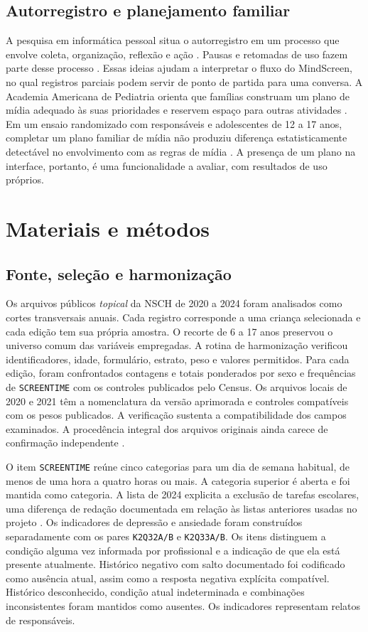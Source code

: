 ﻿\documentclass[12pt]{article}
\begin{document}
\subsection{Autorregistro e planejamento familiar}
A pesquisa em informática pessoal situa o autorregistro em um processo que envolve coleta, organização, reflexão e ação \cite{li2010informatica}. Pausas e retomadas de uso fazem parte desse processo \cite{epstein2015}. Essas ideias ajudam a interpretar o fluxo do MindScreen, no qual registros parciais podem servir de ponto de partida para uma conversa. A Academia Americana de Pediatria orienta que famílias construam um plano de mídia adequado às suas prioridades e reservem espaço para outras atividades \cite{aap2026}. Em um ensaio randomizado com responsáveis e adolescentes de 12 a 17 anos, completar um plano familiar de mídia não produziu diferença estatisticamente detectável no envolvimento com as regras de mídia \cite{moreno2021}. A presença de um plano na interface, portanto, é uma funcionalidade a avaliar, com resultados de uso próprios.

\section{Materiais e métodos}
\subsection{Fonte, seleção e harmonização}
Os arquivos públicos \textit{topical} da NSCH de 2020 a 2024 foram analisados como cortes transversais anuais. Cada registro corresponde a uma criança selecionada e cada edição tem sua própria amostra. O recorte de 6 a 17 anos preservou o universo comum das variáveis empregadas. A rotina de harmonização verificou identificadores, idade, formulário, estrato, peso e valores permitidos. Para cada edição, foram confrontados contagens e totais ponderados por sexo e frequências de \texttt{SCREENTIME} com os controles publicados pelo Census. Os arquivos locais de 2020 e 2021 têm a nomenclatura da versão aprimorada e controles compatíveis com os pesos publicados. A verificação sustenta a compatibilidade dos campos examinados. A procedência integral dos arquivos originais ainda carece de confirmação independente \cite{censusguide}.

O item \texttt{SCREENTIME} reúne cinco categorias para um dia de semana habitual, de menos de uma hora a quatro horas ou mais. A categoria superior é aberta e foi mantida como categoria. A lista de 2024 explicita a exclusão de tarefas escolares, uma diferença de redação documentada em relação às listas anteriores usadas no projeto \cite{census2020,census2024}. Os indicadores de depressão e ansiedade foram construídos separadamente com os pares \texttt{K2Q32A/B} e \texttt{K2Q33A/B}. Os itens distinguem a condição alguma vez informada por profissional e a indicação de que ela está presente atualmente. Histórico negativo com salto documentado foi codificado como ausência atual, assim como a resposta negativa explícita compatível. Histórico desconhecido, condição atual indeterminada e combinações inconsistentes foram mantidos como ausentes. Os indicadores representam relatos de responsáveis.
\end{document}
